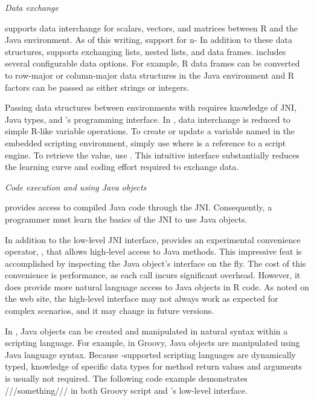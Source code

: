 \noindent \textit{Data exchange}

\noindent {} supports data interchange for scalars, vectors, and matrices between R and the Java environment. As of this writing,  support for n- In addition to these data structures,  supports exchanging lists, nested lists, and data frames.  includes several configurable data options. For example, R data frames can be converted to row-major or column-major data structures in the Java environment and R factors can be passed as either strings or integers.

Passing data structures between environments with  requires knowledge of JNI, Java types, and 's programming interface. In , data interchange is reduced to simple R-like variable operations. To create or update a variable named  in the embedded scripting environment, simply use  where  is a  reference to a script engine. To retrieve the value, use . This intuitive interface substantially reduces the learning curve and coding effort required to exchange data.

\noindent \textit{Code execution and using Java objects}

\noindent {} provides access to compiled Java code through the JNI. Consequently, a programmer must learn the basics of the JNI to use Java objects. 

In addition to the low-level JNI interface,  provides an experimental convenience operator, \code{\$}, that allows high-level access to Java methods. This impressive feat is accomplished by inspecting the Java object's interface on the fly. The cost of this convenience is performance, as each call incurs significant overhead. However, it does provide more natural language access to Java objects in R code. As noted on the  web site, the high-level interface may not always work as expected for complex scenarios, and it may change in future versions.


In , Java objects can be created and manipulated in natural syntax within a scripting language. For example, in Groovy, Java objects are manipulated using Java language syntax. Because -supported scripting languages are dynamically typed, knowledge of specific data types for method return values and arguments is usually not required. The following code example demonstrates ///something/// in both Groovy script and 's low-level interface.

